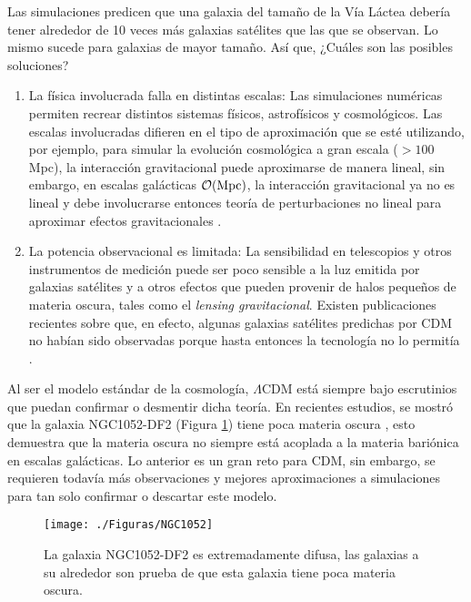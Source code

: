 \documentclass[a4paper,openright,12pt]{book}
\begin{document}
Las simulaciones predicen que una galaxia del tamaño de la Vía Láctea debería tener alrededor de 10 veces más galaxias satélites que las que se observan. Lo mismo sucede para galaxias de mayor tamaño. Así que, ¿Cuáles son las posibles soluciones?
\begin{enumerate}
\item La física involucrada falla en distintas escalas: Las simulaciones numéricas permiten recrear distintos sistemas físicos, astrofísicos y cosmológicos. Las escalas involucradas difieren en el tipo de aproximación que se esté utilizando, por ejemplo, para simular la evolución cosmológica a gran escala ($>100$ Mpc), la interacción gravitacional puede aproximarse de manera lineal, sin embargo, en escalas galácticas $\mathcal{O}(\textup{Mpc})$, la interacción gravitacional ya no es lineal y  debe involucrarse entonces teoría de perturbaciones no lineal para aproximar efectos gravitacionales \cite{1.2.5}.

\item La potencia observacional es limitada: La sensibilidad en telescopios y otros instrumentos de medición puede ser poco sensible a la luz emitida por galaxias satélites y a otros efectos que pueden provenir de halos pequeños de materia oscura, tales como el \textit{lensing gravitacional}. Existen publicaciones recientes sobre que, en efecto, algunas galaxias satélites predichas por CDM no habían sido observadas porque hasta entonces la tecnología no lo permitía \cite{1.2.6}.
\end{enumerate}

Al ser el modelo estándar de la cosmología, $\Lambda$CDM está siempre bajo escrutinios que puedan confirmar o desmentir dicha teoría. En recientes estudios, se mostró que la galaxia NGC1052-DF2 (Figura \ref{fig 1.10}) tiene poca materia oscura \cite{1.2.6.1}, esto demuestra que la materia oscura no siempre está acoplada a la materia bariónica en escalas galácticas. Lo anterior es un gran reto para CDM, sin embargo, se requieren todavía más observaciones y mejores aproximaciones a simulaciones para tan solo confirmar o descartar este modelo.

\begin{figure}
\centering
\texttt{[image: ./Figuras/NGC1052]}
\caption{\footnotesize{La galaxia NGC1052-DF2 es extremadamente difusa, las galaxias a su alrededor son prueba de que esta galaxia tiene poca materia oscura.}}\label{fig 1.10}
\end{figure}
 
\end{document}
